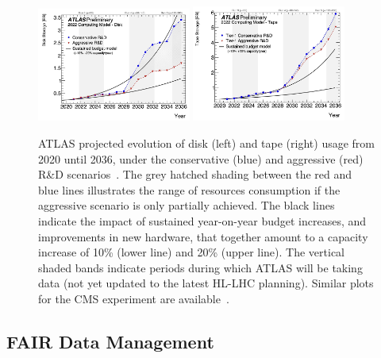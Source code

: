 \begin{figure}[htbp]
\begin{center}
\includegraphics[width=0.45\textwidth]{figures/Figure3a} 
\includegraphics[width=0.45\textwidth]{figures/Figure3b} \\ 
\caption{ATLAS projected evolution of disk (left) and tape (right) usage from 2020 until 2036, under the conservative (blue) and aggressive (red) R\&D scenarios~\cite{CERN-LHCC-2022-005}. The grey hatched shading between the red and blue lines illustrates the range of resources consumption if the aggressive scenario is only partially achieved. The black lines indicate the impact of sustained year-on-year budget increases, and improvements in new hardware, that together amount to a capacity increase of 10\% (lower line) and 20\% (upper line). The vertical shaded bands indicate periods during which ATLAS will be taking data (not yet updated to the latest HL-LHC planning). Similar plots for the CMS experiment are available~\cite{Software:2815292}.}
\label{figures:Fig3}
\end{center}
\end{figure}


\subsection{FAIR Data Management}


